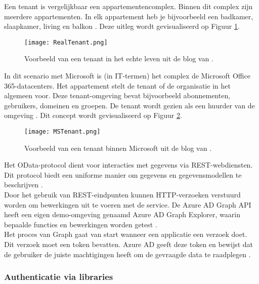 Een tenant is vergelijkbaar een appartementencomplex. Binnen dit complex zijn meerdere appartementen. In elk appartement heb je bijvoorbeeld een badkamer, slaapkamer, living en balkon \autocite{Saxton2015}. Deze uitleg wordt gevisualiseerd op Figuur \ref{rlt}. \\

\begin{figure}[!h]
    \texttt{[image: RealTenant.png]}
    \caption[Voorbeeld werkelijke tenant]{Voorbeeld van een tenant in het echte leven uit de blog van \textcite{Saxton2015}.}
    \label{rlt}
\end{figure}

In dit scenario met Microsoft is (in \ac{IT}-termen) het complex de Microsoft Office 365-datacenters. Het appartement stelt de tenant of de organisatie in het algemeen voor. Deze tenant-omgeving bevat bijvoorbeeld abonnementen, gebruikers, domeinen en groepen. De tenant wordt gezien als een huurder van de omgeving \autocite{Saxton2015}. Dit concept wordt gevisualiseerd op Figuur \ref{mst}. \\

\begin{figure}[h!]
    \texttt{[image: MSTenant.png]}
    \caption[Voorbeeld Microsoft tenant]{Voorbeeld van een tenant binnen Microsoft uit de blog van \textcite{Saxton2015}.}
    \label{mst}
\end{figure}

Het OData-protocol dient voor interacties met gegevens via \ac{REST}-webdiensten. Dit protocol biedt een uniforme manier om gegevens en gegevensmodellen te beschrijven \autocite{OData2023}. \\

Door het gebruik van \ac{REST}-eindpunten kunnen \ac{HTTP}-verzoeken verstuurd worden om bewerkingen uit te voeren met de service. De Azure \ac{AD} Graph \ac{API} heeft een eigen demo-omgeving genaamd Azure \ac{AD} Graph Explorer, waarin bepaalde functies en bewerkingen worden getest \autocite{Microsoft}. \\

Het proces van Graph gaat van start wanneer een applicatie een verzoek doet. Dit verzoek moet een token bevatten. Azure \ac{AD} geeft deze token en bewijst dat de gebruiker de juiste machtigingen heeft om de gevraagde data te raadplegen \autocite{Microsoft2015}.



\subsubsection{Authenticatie via libraries}

